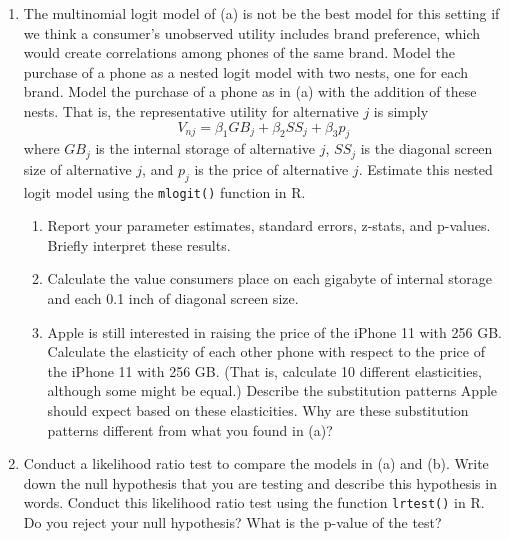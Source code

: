 \documentclass[11pt,letterpaper]{article}
\begin{document}
\begin{enumerate}[label=\alph*., leftmargin=*]
	\item The multinomial logit model of (a) is not be the best model for this setting if we think a consumer's unobserved utility includes brand preference, which would create correlations among phones of the same brand. Model the purchase of a phone as a nested logit model with two nests, one for each brand. Model the purchase of a phone as in (a) with the addition of these nests. That is, the representative utility for alternative $j$ is simply
	$$V_{nj} = \beta_1 GB_j + \beta_2 SS_j + \beta_3 p_j$$
	where $GB_j$ is the internal storage of alternative $j$, $SS_j$ is the diagonal screen size of alternative $j$, and $p_j$ is the price of alternative $j$. Estimate this nested logit model using the \texttt{mlogit()} function in R. 
	\begin{enumerate}[label=\roman*.]
		\item Report your parameter estimates, standard errors, z-stats, and p-values. Briefly interpret these results. 
		\item Calculate the value consumers place on each gigabyte of internal storage and each 0.1 inch of diagonal screen size.
		\item Apple is still interested in raising the price of the iPhone 11 with 256 GB. Calculate the elasticity of each other phone with respect to the price of the iPhone 11 with 256 GB. (That is, calculate 10 different elasticities, although some might be equal.) Describe the substitution patterns Apple should expect based on these elasticities. Why are these substitution patterns different from what you found in (a)?
	\end{enumerate}

	\item Conduct a likelihood ratio test to compare the models in (a) and (b). Write down the null hypothesis that you are testing and describe this hypothesis in words. Conduct this likelihood ratio test using the function \texttt{lrtest()} in R. Do you reject your null hypothesis? What is the p-value of the test?


\end{enumerate}
\end{document}
